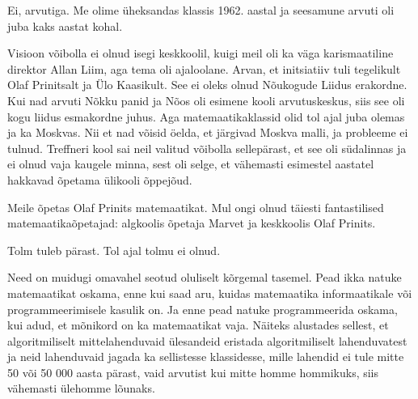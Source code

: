 
Ei, arvutiga. Me olime üheksandas klassis 1962. aastal ja
seesamune arvuti oli juba kaks aastat kohal.


Visioon võibolla ei olnud isegi keskkoolil, kuigi meil
oli ka väga karismaatiline direktor Allan Liim, aga tema oli ajaloolane. Arvan, et initsiatiiv tuli tegelikult
Olaf Prinitsalt ja Ülo Kaasikult. See ei oleks olnud Nõukogude Liidus erakordne. Kui nad arvuti
Nõkku panid ja Nõos oli esimene kooli arvutuskeskus, siis
see oli kogu liidus esmakordne juhus. Aga matemaatikaklassid olid tol ajal juba
olemas ja ka Moskvas. Nii et nad võisid öelda, et järgivad
Moskva malli, ja probleeme ei tulnud. Treffneri kool sai neil valitud võibolla sellepärast, et see oli südalinnas ja
ei olnud vaja kaugele minna, sest oli selge, et vähemasti esimestel
aastatel hakkavad õpetama ülikooli õppejõud.

Meile õpetas Olaf Prinits
matemaatikat. Mul ongi olnud täiesti fantastilised
matemaatikaõpetajad: algkoolis õpetaja Marvet ja keskkoolis Olaf
Prinits.


Tolm tuleb pärast. Tol ajal tolmu ei olnud.

Need on muidugi omavahel seotud oluliselt kõrgemal tasemel. Pead ikka natuke matemaatikat oskama, enne kui saad aru, kuidas matemaatika informaatikale või programmeerimisele kasulik on. Ja
enne pead natuke programmeerida oskama, kui adud, et mõnikord on ka
matemaatikat vaja. Näiteks alustades sellest, et algoritmiliselt
mittelahenduvaid ülesandeid eristada algoritmiliselt lahenduvatest ja neid
lahenduvaid jagada ka sellistesse klassidesse, mille lahendid ei tule mitte 50
või 50 000 aasta pärast, vaid arvutist kui mitte homme
hommikuks, siis vähemasti ülehomme lõunaks.



